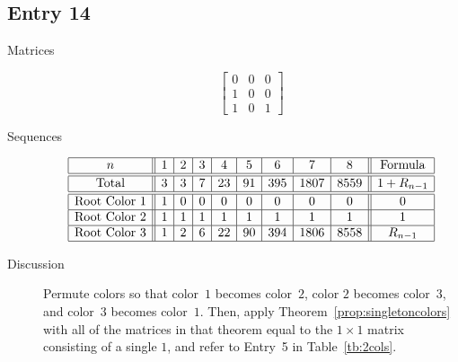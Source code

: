 \documentclass[12pt]{amsart}
\begin{document}
\subsection*{Entry 14}
\begin{description}
    \item[Matrices]
    
    \[\begin{bmatrix}
0 & 0 & 0 \\
1 & 0 & 0 \\
1 & 0 & 1
\end{bmatrix}\]
    \item[Sequences]\hspace*{\fill}\vspace{-0.5cm}
    \begin{center}
        \[
        \begin{array}{|c||c|c|c|c|c|c|c|c||c|}\hline
           n  & 1 & 2 & 3 & 4 & 5 & 6 & 7 & 8  & \text{Formula}\\\hline\hline
           \text{Total}  & 3 & 3 & 7 & 23 & 91 & 395 & 1807 & 8559 & 1+R_{n-1}\\\hline\hline
           \text{Root Color }1 & 1 & 0 & 0 & 0 & 0 & 0 & 0 & 0 & 0\\\hline
           \text{Root Color }2 & 1 & 1 & 1 & 1 & 1 & 1 & 1 & 1 & 1\\\hline
           \text{Root Color }3 & 1 & 2 & 6 & 22 & 90 & 394 & 1806 & 8558 & R_{n-1}\\\hline
        \end{array}
        \]
    \end{center}
    

    \item[Discussion] 
    Permute colors so that color~$1$ becomes color~$2$, color $2$ becomes color~$3$, and color~$3$ becomes color~$1$. Then, apply Theorem~\ref{prop:singletoncolors} with all of the matrices in that theorem equal to the $1\times1$ matrix consisting of a single $1$, and refer to Entry~5 in Table~\ref{tb:2cols}.
\end{description}
\end{document}
